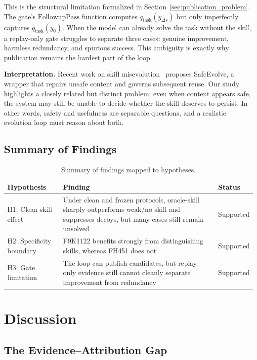 ﻿\documentclass[preprint,12pt]{elsarticle}
\begin{document}
This is the structural limitation formalized in
Section~\ref{sec:publication_problem}.  The gate's
$\mathrm{FollowupPass}$ function computes $q_{\mathrm{task}}(y_{\Delta s})$
but only imperfectly captures $q_{\mathrm{task}}(y_0)$.  When the model can
already solve the task without the skill, a replay-only gate struggles to
separate three cases: genuine improvement, harmless redundancy, and
spurious success.  This ambiguity is exactly why publication remains the
hardest part of the loop.

\textbf{Interpretation.}
Recent work on skill misevolution~\cite{misevolution} proposes SafeEvolve, a wrapper that repairs unsafe
content and governs subsequent reuse.  Our study highlights a closely
related but distinct problem: even when content appears safe, the system
may still be unable to decide whether the skill deserves to persist.  In
other words, safety and usefulness are separable questions, and a realistic
evolution loop must reason about both.

\subsection{Summary of Findings}

\begin{table}[t]
\centering
\caption{Summary of findings mapped to hypotheses.}
\label{tab:findings}
\small
\begin{tabularx}{\textwidth}{lXl}
\toprule
Hypothesis & Finding & Status \\
\midrule
H1: Clean skill effect & Under clean and frozen protocols, oracle-skill sharply outperforms weak/no skill and suppresses decoys, but many cases still remain unsolved & Supported \\
H2: Specificity boundary & F9K1122 benefits strongly from distinguishing skills, whereas FH451 does not & Supported \\
H3: Gate limitation & The loop can publish candidates, but replay-only evidence still cannot cleanly separate improvement from redundancy & Supported \\
\bottomrule
\end{tabularx}
\end{table}

\section{Discussion}
\label{sec:discussion}

\subsection{The Evidence--Attribution Gap}
\end{document}
